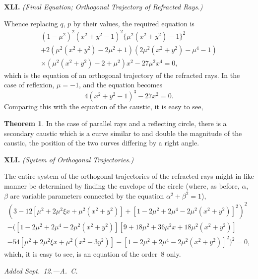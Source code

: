\documentclass[12pt,a4paper]{article}
\theoremstyle{definition}
\newtheorem*{theorem}{Theorem}
\begin{document}
\medskip\noindent\textbf{XLI.}
\textit{(Final Equation; Orthogonal Trajectory of Refracted Rays.)}

Whence replacing $q$, $p$ by their values, the required equation is
\begin{multline*}
(1 - \mu^{2})^{2} (x^{2} + y^{2} - 1)^{2}
\{ \mu^{2}(x^{2} + y^{2}) - 1 \}^{2} \\
+ 2(\mu^{2}(x^{2} + y^{2}) - 2\mu^{2} + 1)
(2\mu^{2}(x^{2} + y^{2}) - \mu^{4} - 1) \\
\times (\mu^{2}(x^{2} + y^{2}) - 2 + \mu^{2}) x^{2} - 27\mu^{2}x^{4} = 0,
\end{multline*}
which is the equation of an orthogonal trajectory of the refracted rays.
In the case of reflexion, $\mu = -1$, and the equation becomes
\[
4(x^{2} + y^{2} - 1)^{3} - 27x^{2} = 0.
\]
Comparing this with the equation of the caustic, it is easy to see,

\begin{theorem}
In the case of parallel rays and a reflecting circle, there is a
secondary caustic which is a curve similar to and double the
magnitude of the caustic, the position of the two curves differing
by a right angle.
\end{theorem}

\medskip\noindent\textbf{XLI.}
\textit{(System of Orthogonal Trajectories.)}

The entire system of the orthogonal trajectories of the refracted
rays might in like manner be determined by finding the envelope
of the circle (where, as before, $\alpha$, $\beta$ are variable parameters
connected by the equation $\alpha^{2} + \beta^{2} = 1$),
\begin{multline*}
(3 - 12[\mu^{2} + 2\mu^{2}\xi x + \mu^{2}(x^{2} + y^{2})]
+ [1 - 2\mu^{2} + 2\mu^{4} - 2\mu^{2}(x^{2} + y^{2})]^{2})^{2} \\
- ([1 - 2\mu^{2} + 2\mu^{4} - 2\mu^{2}(x^{2} + y^{2})]
[9 + 18\mu^{2} + 36\mu^{2}x + 18\mu^{2}(x^{2} + y^{2})] \\
- 54[\mu^{2} + 2\mu^{2}\xi x + \mu^{2}(x^{2} - 3y^{2})]
- [1 - 2\mu^{2} + 2\mu^{4} - 2\mu^{2}(x^{2} + y^{2})]^{2})^{2} = 0,
\end{multline*}
which, it is easy to see, is an equation of the order~8 only.

\vspace{1em}
\noindent\textit{Added Sept.\ 12.---A.~C.}

\newpage

\end{document}

